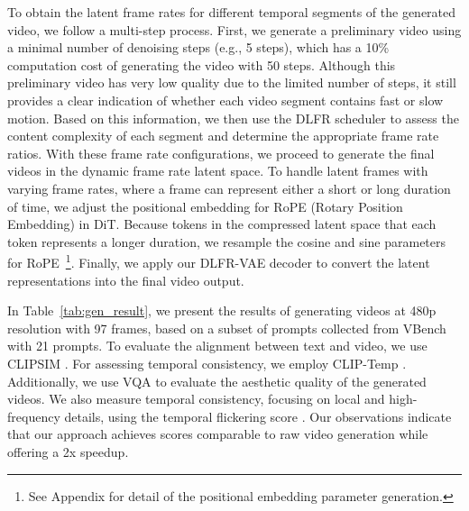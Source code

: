 To obtain the latent frame rates for different temporal segments of the generated video, we follow a multi-step process. First, we generate a preliminary video using a minimal number of denoising steps (e.g., 5 steps), which has a 10\% computation cost of generating the video with 50 steps. Although this preliminary video has very low quality due to the limited number of steps, it still provides a clear indication of whether each video segment contains fast or slow motion. Based on this information, we then use the DLFR scheduler to assess the content complexity of each segment and determine the appropriate frame rate ratios. With these frame rate configurations, we proceed to generate the final videos in the dynamic frame rate latent space. To handle latent frames with varying frame rates, where a frame can represent either a short or long duration of time, we adjust the positional embedding for RoPE (Rotary Position Embedding) in DiT. Because tokens in the compressed latent space that each token represents a longer duration, we resample the cosine and sine parameters for RoPE~\footnote{See Appendix for detail of the positional embedding parameter generation.}. Finally, we apply our DLFR-VAE decoder to convert the latent representations into the final video output.

\begin{table}[tb]
\centering
\caption{Comparing the quality of video generation in raw latent space and our DLFR latent space. The end-to-end latency includes the preliminary video generation, dynamic frame rate schedule and the video generation in the compressed latent space.}
\label{tab:gen_result}
\end{table}

In Table~\ref{tab:gen_result}, we present the results of generating videos at 480p resolution with 97 frames, based on a subset of prompts collected from VBench \cite{huang2024vbench} with 21 prompts. To evaluate the alignment between text and video, we use CLIPSIM \cite{wu2021godiva}. For assessing temporal consistency, we employ CLIP-Temp \cite{esser2023structure}. Additionally, we use VQA \cite{wu2022fastvqa} to evaluate the aesthetic quality of the generated videos. We also measure temporal consistency, focusing on local and high-frequency details, using the temporal flickering score \cite{huang2024vbench}. Our observations indicate that our approach achieves scores comparable to raw video generation while offering a 2x speedup.

